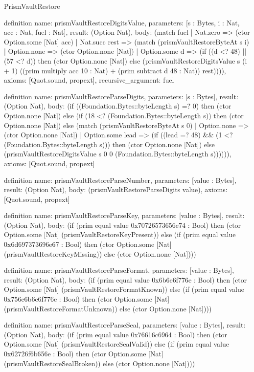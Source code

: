 \begin{lexlean}{PrismVaultRestore}
\begin{semanticmodule}
definition{
  name: prismVaultRestoreDigitsValue,
  parameters: [s : Bytes, i : Nat, acc : Nat, fuel : Nat],
  result: (Option Nat),
  body: (match fuel
    | Nat.zero => (ctor Option.some [Nat] acc)
    | Nat.succ rest => (match (prismVaultRestoreByteAt s i)
      | Option.none => (ctor Option.none [Nat])
      | Option.some d => (if ((d <? 48) || (57 <? d)) then (ctor Option.none [Nat]) else (prismVaultRestoreDigitsValue s (i + 1) ((prim multiply acc 10 : Nat) + (prim subtract d 48 : Nat)) rest)))),
  axioms: [Quot.sound, propext],
  recursive_argument: fuel
}

definition{
  name: prismVaultRestoreParseDigits,
  parameters: [s : Bytes],
  result: (Option Nat),
  body: (if ((Foundation.Bytes::byteLength s) =? 0) then (ctor Option.none [Nat]) else (if (18 <? (Foundation.Bytes::byteLength s)) then (ctor Option.none [Nat]) else (match (prismVaultRestoreByteAt s 0)
    | Option.none => (ctor Option.none [Nat])
    | Option.some lead => (if ((lead =? 48) && (1 <? (Foundation.Bytes::byteLength s))) then (ctor Option.none [Nat]) else (prismVaultRestoreDigitsValue s 0 0 (Foundation.Bytes::byteLength s)))))),
  axioms: [Quot.sound, propext]
}

definition{
  name: prismVaultRestoreParseNumber,
  parameters: [value : Bytes],
  result: (Option Nat),
  body: (prismVaultRestoreParseDigits value),
  axioms: [Quot.sound, propext]
}

definition{
  name: prismVaultRestoreParseKey,
  parameters: [value : Bytes],
  result: (Option Nat),
  body: (if (prim equal value 0x70726573656e74 : Bool) then (ctor Option.some [Nat] (prismVaultRestoreKeyPresent)) else (if (prim equal value 0x6d697373696e67 : Bool) then (ctor Option.some [Nat] (prismVaultRestoreKeyMissing)) else (ctor Option.none [Nat])))
}

definition{
  name: prismVaultRestoreParseFormat,
  parameters: [value : Bytes],
  result: (Option Nat),
  body: (if (prim equal value 0x6b6e6f776e : Bool) then (ctor Option.some [Nat] (prismVaultRestoreFormatKnown)) else (if (prim equal value 0x756e6b6e6f776e : Bool) then (ctor Option.some [Nat] (prismVaultRestoreFormatUnknown)) else (ctor Option.none [Nat])))
}

definition{
  name: prismVaultRestoreParseSeal,
  parameters: [value : Bytes],
  result: (Option Nat),
  body: (if (prim equal value 0x76616c6964 : Bool) then (ctor Option.some [Nat] (prismVaultRestoreSealValid)) else (if (prim equal value 0x62726f6b656e : Bool) then (ctor Option.some [Nat] (prismVaultRestoreSealBroken)) else (ctor Option.none [Nat])))
}


\end{semanticmodule}
\end{lexlean}
